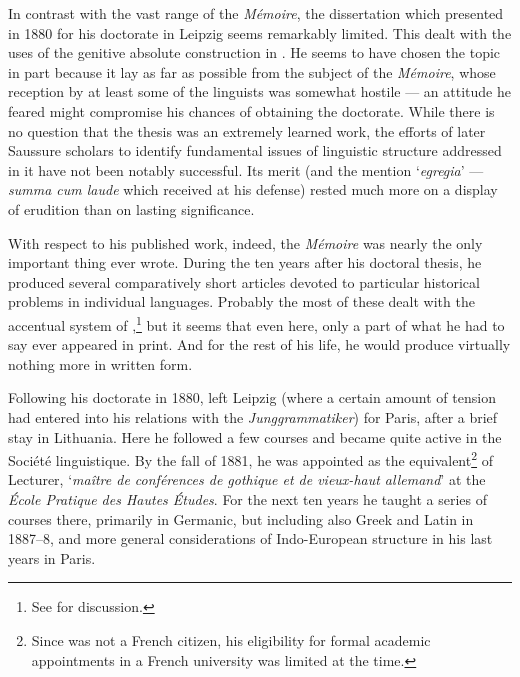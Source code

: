 In {contrast} with the vast range of the \textsl{Mémoire}, the
dissertation which {\Saussure} presented in 1880
\citep{saussure81:dissertation} for his doctorate in {Leipzig} seems
remarkably limited. This dealt with the uses of the genitive absolute
construction in . He seems to have chosen the topic in part
because it lay as far as possible from the subject of the
\textsl{Mémoire}, whose reception by at least some of the
 linguists was somewhat hostile --- an attitude he feared might
compromise his chances of obtaining the doctorate. While there is no
question that the thesis was an extremely learned work, the efforts of
later Saussure scholars to identify fundamental issues of linguistic
structure addressed in it have not been notably successful.  Its merit
(and the mention `\emph{egregia}' --- \emph{summa cum laude} which
{\Saussure} received at his defense) rested much more on a display of
erudition than on lasting significance.

With respect to his published work, indeed, the \textsl{Mémoire} was
nearly the only important thing {\Saussure} ever wrote.  During the ten
years after his doctoral thesis, he produced several comparatively
short articles devoted to particular historical problems in individual
languages.  Probably the most  of these dealt with the
accentual system of ,\footnote{See
  \citealt{joseph09:saussure.lithuanian} for discussion.} but it seems
that even here, only a part of what he had to say ever appeared in
print.  And for the rest of his life, he would produce virtually
nothing more in written form.

Following his doctorate in 1880, {\Saussure} left {Leipzig} (where a
certain amount of tension had entered into his relations with the
\emph{Junggrammatiker}) for Paris, after a brief stay in
Lithuania. Here he followed a few courses and became quite active in
the Société linguistique.  By the fall of 1881, he was appointed as
the equivalent\footnote{Since {\Saussure} was not a {French} citizen, his
  eligibility for formal academic appointments in a {French} university
  was limited at the time.} of Lecturer, `\emph{maître de conférences
  de gothique et de vieux-haut allemand}' at the \emph{École Pratique
  des Hautes Études}. For the next ten years he taught a series of
courses there, primarily in {Germanic}, but including also {Greek} and
{Latin} in 1887--8, and more general considerations of {Indo-European}
structure in his last years in Paris.

